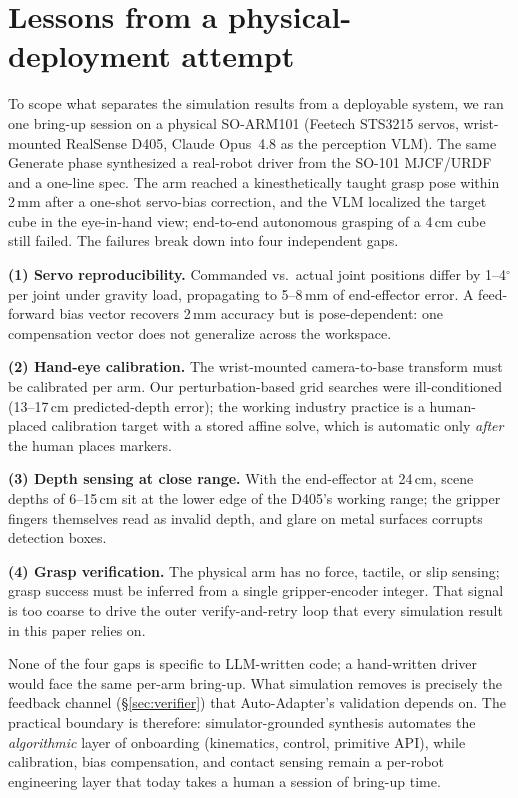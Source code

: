 \section{Lessons from a physical-deployment attempt}
\label{app:real-robot}

To scope what separates the simulation results from a deployable
system, we ran one bring-up session on a physical SO-ARM101
(Feetech STS3215 servos, wrist-mounted RealSense D405, Claude
Opus~4.8 as the perception VLM). The same Generate phase
synthesized a real-robot driver from the SO-101 MJCF/URDF and a
one-line spec. The arm reached a kinesthetically taught grasp pose
within 2\,mm after a one-shot servo-bias correction, and the VLM
localized the target cube in the eye-in-hand view; end-to-end
autonomous grasping of a 4\,cm cube still failed. The
failures break down into four independent gaps.

\noindent\textbf{(1) Servo reproducibility.} Commanded vs.\ actual
joint positions differ by 1--4$^\circ$ per joint under gravity
load, propagating to 5--8\,mm of end-effector error. A
feed-forward bias vector recovers 2\,mm accuracy but is
pose-dependent: one compensation vector does not generalize across
the workspace.

\noindent\textbf{(2) Hand-eye calibration.} The wrist-mounted
camera-to-base transform must be calibrated per arm. Our
perturbation-based grid searches were ill-conditioned (13--17\,cm
predicted-depth error); the working industry practice is a
human-placed calibration target with a stored affine solve, which
is automatic only \emph{after} the human places markers.

\noindent\textbf{(3) Depth sensing at close range.} With the
end-effector at 24\,cm, scene depths of 6--15\,cm sit at the lower
edge of the D405's working range; the gripper fingers themselves
read as invalid depth, and glare on metal surfaces corrupts
detection boxes.

\noindent\textbf{(4) Grasp verification.} The physical arm has no
force, tactile, or slip sensing; grasp success must be inferred
from a single gripper-encoder integer. That signal is too coarse
to drive the outer verify-and-retry loop that every simulation
result in this paper relies on.

None of the four gaps is specific to LLM-written code; a
hand-written driver would face the same per-arm bring-up. What
simulation removes is precisely the feedback channel
(\S\ref{sec:verifier}) that Auto-Adapter's validation depends on.
The practical boundary is therefore: simulator-grounded synthesis
automates the \emph{algorithmic} layer of onboarding (kinematics,
control, primitive API), while calibration, bias compensation, and
contact sensing remain a per-robot engineering layer that today
takes a human a session of bring-up time.

